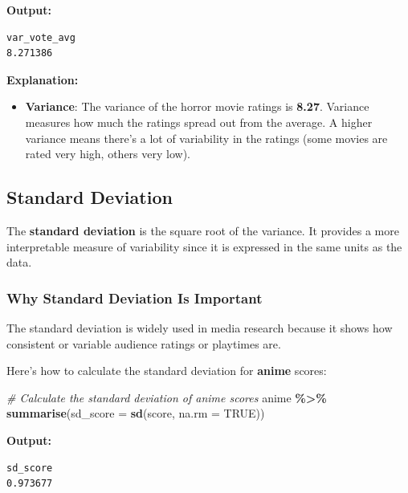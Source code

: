 \documentclass[
]{book}
\newenvironment{Shaded}{\begin{snugshade}}{\end{snugshade}}
\newcommand{\AttributeTok}[1]{\textcolor[rgb]{0.13,0.29,0.53}{#1}}
\newcommand{\CommentTok}[1]{\textcolor[rgb]{0.56,0.35,0.01}{\textit{#1}}}
\newcommand{\ConstantTok}[1]{\textcolor[rgb]{0.56,0.35,0.01}{#1}}
\newcommand{\FunctionTok}[1]{\textcolor[rgb]{0.13,0.29,0.53}{\textbf{#1}}}
\newcommand{\NormalTok}[1]{#1}
\newcommand{\SpecialCharTok}[1]{\textcolor[rgb]{0.81,0.36,0.00}{\textbf{#1}}}
\providecommand{\tightlist}{%
  \setlength{\itemsep}{0pt}\setlength{\parskip}{0pt}}
\begin{document}
\textbf{Output:}

\begin{verbatim}
var_vote_avg
8.271386
\end{verbatim}

\textbf{Explanation:}

\begin{itemize}
\tightlist
\item
  \textbf{Variance}: The variance of the horror movie ratings is \textbf{8.27}. Variance measures how much the ratings spread out from the average. A higher variance means there's a lot of variability in the ratings (some movies are rated very high, others very low).
\end{itemize}

\subsection*{Standard Deviation}\label{standard-deviation}

The \textbf{standard deviation} is the square root of the variance. It provides a more interpretable measure of variability since it is expressed in the same units as the data.

\subsubsection*{Why Standard Deviation Is Important}\label{why-standard-deviation-is-important}

The standard deviation is widely used in media research because it shows how consistent or variable audience ratings or playtimes are.

Here's how to calculate the standard deviation for \textbf{anime} scores:

\begin{Shaded}
\begin{Highlighting}[]
\CommentTok{\# Calculate the standard deviation of anime scores}
\NormalTok{anime }\SpecialCharTok{\%\textgreater{}\%}
  \FunctionTok{summarise}\NormalTok{(}\AttributeTok{sd\_score =} \FunctionTok{sd}\NormalTok{(score, }\AttributeTok{na.rm =} \ConstantTok{TRUE}\NormalTok{))}
\end{Highlighting}
\end{Shaded}

\textbf{Output:}

\begin{verbatim}
sd_score
0.973677
\end{verbatim}
\end{document}

